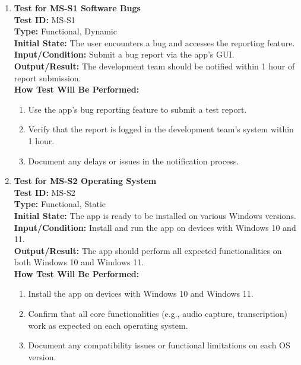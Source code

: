 \documentclass[12pt, titlepage]{article}
\begin{document}
\begin{enumerate}
    \item \textbf{Test for MS-S1 Software Bugs} \\
      \newline
      \textbf{Test ID:} MS-S1 \\
      \textbf{Type:} Functional, Dynamic \\
      \textbf{Initial State:} The user encounters a bug and accesses the reporting feature. \\
      \textbf{Input/Condition:} Submit a bug report via the app’s GUI. \\
      \textbf{Output/Result:} The development team should be notified within 1 hour of report submission. \\
      \textbf{How Test Will Be Performed:}
      \begin{enumerate}
          \item Use the app’s bug reporting feature to submit a test report.
          \item Verify that the report is logged in the development team’s system within 1 hour.
          \item Document any delays or issues in the notification process.
      \end{enumerate}

    \item \textbf{Test for MS-S2 Operating System} \\
      \newline
      \textbf{Test ID:} MS-S2 \\
      \textbf{Type:} Functional, Static \\
      \textbf{Initial State:} The app is ready to be installed on various Windows versions. \\
      \textbf{Input/Condition:} Install and run the app on devices with Windows 10 and 11. \\
      \textbf{Output/Result:} The app should perform all expected functionalities on both Windows 10 and Windows 11. \\
      \textbf{How Test Will Be Performed:}
      \begin{enumerate}
          \item Install the app on devices with Windows 10 and Windows 11.
          \item Confirm that all core functionalities (e.g., audio capture, transcription) work as expected on each operating system.
          \item Document any compatibility issues or functional limitations on each OS version.
      \end{enumerate}


\end{enumerate}
\end{document}
